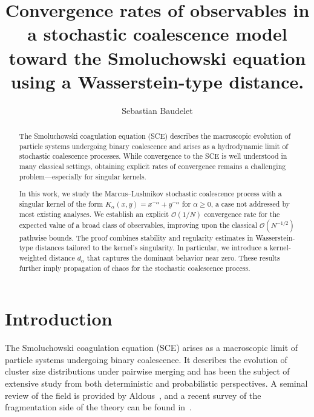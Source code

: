 \documentclass[11pt,a4paper]{article}
\title{}      %
\author{
   Sebastian Baudelet
}
\title{Convergence rates of observables in a stochastic coalescence model toward the Smoluchowski equation using a Wasserstein-type distance.}
\date{}
\begin{document}
\maketitle


\begin{abstract}
    The Smoluchowski coagulation equation (SCE) describes the macroscopic evolution of particle systems undergoing binary coalescence and arises as a hydrodynamic limit of stochastic coalescence processes. While convergence to the SCE is well understood in many classical settings, obtaining explicit rates of convergence remains a challenging problem—especially for singular kernels.
    
    In this work, we study the Marcus–Lushnikov stochastic coalescence process with a singular kernel of the form \( K_\alpha(x, y) = x^{-\alpha} + y^{-\alpha} \) for \( \alpha \geq 0 \), a case not addressed by most existing analyses. We establish an explicit \( \mathcal{O}(1/N) \) convergence rate for the expected value of a broad class of observables, improving upon the classical \( \mathcal{O}(N^{-1/2}) \) pathwise bounds. The proof combines stability and regularity estimates in Wasserstein-type distances tailored to the kernel's singularity. In particular, we introduce a kernel-weighted distance \( d_\alpha \) that captures the dominant behavior near zero. These results further imply propagation of chaos for the stochastic coalescence process.
\end{abstract}

    

\tableofcontents

\section{Introduction}

The Smoluchowski coagulation equation (SCE) arises as a macroscopic limit of particle systems undergoing binary coalescence. It describes the evolution of cluster size distributions under pairwise merging and has been the subject of extensive study from both deterministic and probabilistic perspectives. A seminal review of the field is provided by Aldous~\cite{aldousDeterministicStochasticModels1999}, and a recent survey of the fragmentation side of the theory can be found in~\cite{deaconuProbabilisticRepresentationsFragmentation2023}.
\end{document}

